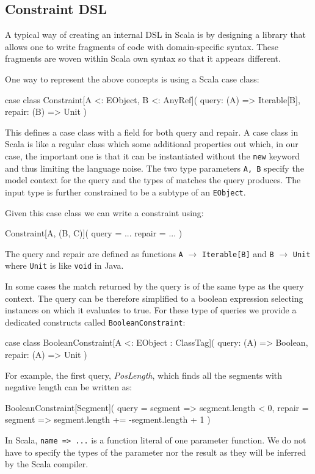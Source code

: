 \subsection{Constraint DSL}

A typical way of creating an internal DSL in Scala is by designing a library that allows one to write fragments of code with domain-specific syntax.
These fragments are woven within Scala own syntax so that it appears different.

One way to represent the above concepts is using a Scala case class:
%
\begin{scalacode}
case class Constraint[A <: EObject, B <: AnyRef](
  query: (A) => Iterable[B],
  repair: (B) => Unit
)
\end{scalacode}
%
This defines a case class with a field for both query and repair.
A case class in Scala is like a regular class which some additional properties out which, in our case, the important one is that it can be instantiated without the \texttt{new} keyword and thus limiting the language noise.
The two type parameters \texttt{A, B} specify the model context for the query and the types of matches the query produces.
The input type is further constrained to be a subtype of an \texttt{EObject}.

Given this case class we can write a constraint using:
%
\begin{scalacode}
Constraint[A, (B, C)](
  query = ...
  repair = ...
)
\end{scalacode}
%
The query and repair are defined as functions \texttt{A} $\rightarrow$ \texttt{Iterable[B]} and \texttt{B} $\rightarrow$ \texttt{Unit} where \texttt{Unit} is like \texttt{void} in Java.

In some cases the match returned by the query is of the same type as the query context.
The query can be therefore simplified to a boolean expression selecting instances on which it evaluates to true.
For these type of queries we provide a dedicated constructs called \texttt{BooleanConstraint}:
%
\begin{scalacode}
case class BooleanConstraint[A <: EObject : ClassTag](
  query: (A) => Boolean, 
  repair: (A) => Unit
)
\end{scalacode}

For example, the first query, \emph{PosLength}, which finds all the segments with negative length can be written as:
%
\begin{scalacode}
BooleanConstraint[Segment](
  query = segment => segment.length < 0,
  repair = segment => segment.length += -segment.length + 1
)
\end{scalacode}
%
In Scala, \texttt{name => ...} is a function literal of one parameter function.
We do not have to specify the types of the parameter nor the result as they will be inferred by the Scala compiler.

